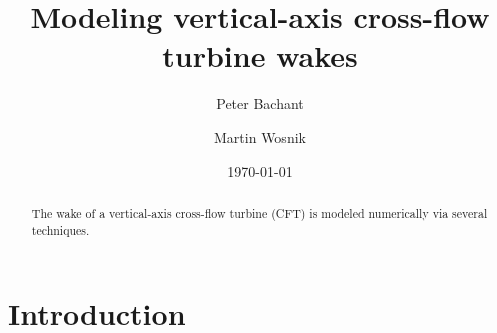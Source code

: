 \documentclass[aip,graphicx]{revtex4-1}
\begin{document}

\title{Modeling vertical-axis cross-flow turbine wakes}



\author{Peter Bachant}

\author{Martin Wosnik} 


\date{\today}

\begin{abstract}
The wake of a vertical-axis cross-flow turbine (CFT) is modeled numerically via
several techniques.
\end{abstract}

\pacs{}%

\maketitle %
\listoftodos

\section{Introduction}
\end{document}
